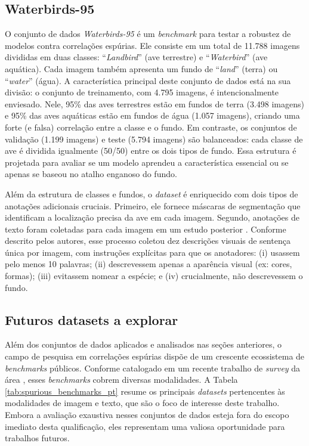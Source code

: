 \subsection{Waterbirds-95}

O conjunto de dados \textit{Waterbirds-95} \cite{group_dro} é um \textit{benchmark} para testar a robustez de modelos contra correlações espúrias. Ele consiste em um total de 11.788 imagens divididas em duas classes: ``\textit{Landbird}'' (ave terrestre) e ``\textit{Waterbird}'' (ave aquática). Cada imagem também apresenta um fundo de ``\textit{land}'' (terra) ou ``\textit{water}'' (água). A característica principal deste conjunto de dados está na sua divisão: o conjunto de treinamento, com 4.795 imagens, é intencionalmente enviesado. Nele, 95\% das aves terrestres estão em fundos de terra (3.498 imagens) e 95\% das aves aquáticas estão em fundos de água (1.057 imagens), criando uma forte (e falsa) correlação entre a classe e o fundo. Em contraste, os conjuntos de validação (1.199 imagens) e teste (5.794 imagens) são balanceados: cada classe de ave é dividida igualmente (50/50) entre os dois tipos de fundo. Essa estrutura é projetada para avaliar se um modelo aprendeu a característica essencial ou se apenas se baseou no atalho enganoso do fundo.

Além da estrutura de classes e fundos, o \textit{dataset} é enriquecido com dois tipos de anotações adicionais cruciais. Primeiro, ele fornece máscaras de segmentação que identificam a localização precisa da ave em cada imagem. Segundo, anotações de texto foram coletadas para cada imagem em um estudo posterior \cite{waterbirds_text}. Conforme descrito pelos autores, esse processo coletou dez descrições visuais de sentença única por imagem, com instruções explícitas para que os anotadores: (i) usassem pelo menos 10 palavras; (ii) descrevessem apenas a aparência visual (ex: cores, formas); (iii) evitassem nomear a espécie; e (iv) crucialmente, não descrevessem o fundo.

\subsection{Futuros datasets a explorar}


Além dos conjuntos de dados aplicados e analisados nas seções anteriores, o campo de pesquisa em correlações espúrias dispõe de um crescente ecossistema de \textit{benchmarks} públicos.  Conforme catalogado em um recente trabalho de \textit{survey} da área \cite{spurious_correlations_survey}, esses \textit{benchmarks} cobrem diversas modalidades. A Tabela \ref{tab:spurious_benchmarks_pt} resume os principais \textit{datasets} pertencentes às modalidades de imagem e texto, que são o foco de interesse deste trabalho. Embora a avaliação exaustiva nesses conjuntos de dados esteja fora do escopo imediato desta qualificação, eles representam uma valiosa oportunidade para trabalhos futuros.



